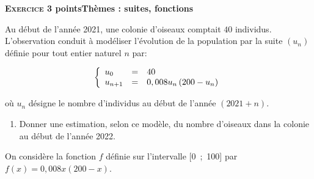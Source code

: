 \documentclass[11pt]{article}
\begin{document}
\bigskip

\textbf{\textsc{Exercice 3}  points\hfill Thèmes : suites, fonctions}

\medskip

Au début de l'année 2021, une colonie d'oiseaux comptait $40$ individus. L'observation conduit à modéliser l'évolution de la population par la suite $\left(u_n\right)$ définie pour tout entier naturel $n$ par:

\[\left\{\begin{array}{l c l}
u_0&=&40\\
u_{n+1}&=&0,008u_n\left(200 - u_n\right)
\end{array}\right.\]

où $u_n$ désigne le nombre d'individus au début de l'année $(2021+n)$.

\medskip


\begin{enumerate}
\item Donner une estimation, selon ce modèle, du nombre d'oiseaux dans la colonie au
début de l'année 2022.
\end{enumerate}

On considère la fonction $f$ définie sur l'intervalle [0~;~100] par $f(x) = 0,008x(200 - x)$.
\end{document}
